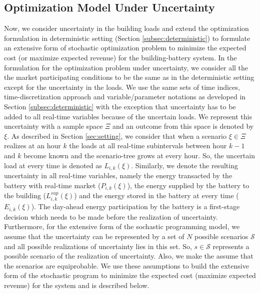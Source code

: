 \documentclass[11pt,twoside]{article}
\begin{document}
\subsection{Optimization Model Under Uncertainty} \label{subsec:opt_unc}
Now, we consider uncertainty in the building loads and extend the optimization formulation in deterministic setting (Section \ref{subsec:deterministic}) to formulate an extensive form of stochastic optimization problem to minimize the expected cost (or maximize expected revenue) for the building-battery system. In the formulation for the optimization problem under uncertainty, we consider all the the market participating conditions to be the same as in the deterministic setting except for the uncertainty in the loads. We use the same sets of time indices, time-discretization approach and variable/parameter notations as developed in Section \ref{subsec:deterministic} with the exception that uncertainty has to be added to all real-time variables because of the uncertain loads. We represent this uncertainty with a sample space $\Xi$ and an outcome from this space is denoted by $\xi$. As described in Section \ref{sec:setting}, we consider that when a scenario $\xi \in \Xi$ realizes at an hour $k$ the loads at all real-time subintervals between hour $k-1$ and $k$ become known and the scenario-tree grows at every hour. So, the uncertain load at every time is denoted as $L_{i,k}(\xi)$. Similarly, we denote the resulting uncertainty in all real-time variables, namely the energy transacted by the battery with real-time market ($P_{i,k}(\xi)$), the energy supplied by the battery to the building ($L^{sup}_{i,k}(\xi)$) and the energy stored in the battery at every time ($E_{i,k}(\xi)$). The day-ahead energy participation by the battery is a first-stage decision which needs to be made before the realization of uncertainty. Furthermore, for the extensive form of the sochastic programming model, we assume that the uncertainty can be represented by a set of $N$ possible scenarios $\mathcal{S}$ and all possible realizations of uncertainty lies in this set. So, $s \in \mathcal{S}$ represents a possible scenario of the realization of uncertainty. Also, we make the assume that the scenarios are equiprobable. We use these assumptions to build the extensive form of the stochastic program to minimize the expected cost (maximize expected revenue) for the system and is described below.
\end{document}
